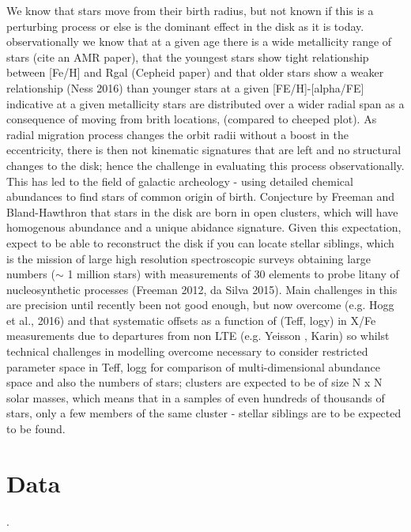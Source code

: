 \documentclass[12pt, preprint]{aastex}
\begin{document}
We know that stars move from their birth radius, but not known if this is a perturbing process or else is the dominant effect in the disk as it is today. observationally we know that at a given age there is a wide metallicity range of stars (cite an AMR paper), that the youngest stars show tight relationship between [Fe/H] and Rgal (Cepheid paper) and that older stars show  a weaker relationship (Ness 2016) than younger stars at a given [FE/H]-[alpha/FE] indicative at a given metallicity stars are distributed over a wider radial span as a consequence of moving from brith locations, (compared to cheeped plot). As radial migration process changes the orbit radii without a boost in the eccentricity, there is then not kinematic signatures that are left and no structural changes to the disk; hence the challenge in evaluating this process observationally. This has led to the field of galactic archeology - using detailed chemical abundances to find stars of common origin of birth. Conjecture by Freeman and Bland-Hawthron that stars in the disk are born in open clusters, which will have homogenous abundance and a unique abidance signature. Given this expectation, expect to be able to reconstruct the disk if you can locate stellar siblings, which is the mission of  large high resolution spectroscopic surveys obtaining large numbers ($\sim$ 1 million stars) with measurements of 30 elements to probe litany of nucleosynthetic processes (Freeman 2012, da Silva 2015). Main challenges in this are precision until recently been not good enough, but now overcome (e.g. Hogg et al., 2016) and that systematic offsets as a function of (Teff, logy) in X/Fe measurements due to departures from non LTE (e.g. Yeisson , Karin) so whilst technical challenges in modelling overcome necessary to consider restricted parameter space in Teff, logg for comparison of multi-dimensional abundance space and also the numbers of stars; clusters are expected to be of size N x N solar masses, which means that in a samples of even hundreds of thousands of stars, only a few members of the same cluster - stellar siblings are to be expected to be found. 

\section{Data}. 

\end{document}
